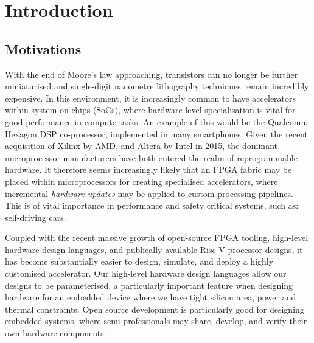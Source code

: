 \documentclass[a4paper,8pt]{report}
\begin{document}
\pagestyle{empty}
\singlespacing

\onehalfspacing

\singlespacing


\setcounter{page}{0}
\pagestyle{plain}
\tableofcontents
\listoffigures
\listoftables

\onehalfspacing

\chapter{Introduction}
\setcounter{page}{1} 
\section{Motivations}

With the end of Moore's law\cite{moore} approaching, transistors can no longer be further
miniaturised and single-digit nanometre lithography techniques remain incredibly
expensive. In this environment, it is increasingly common to have accelerators
within system-on-chips (SoCs), where hardware-level specialisation is vital for
good performance in compute tasks. An example of this would be the Qualcomm
Hexagon DSP co-processor\cite{QC-Hexagon}, implemented in many smartphones. Given the recent
acquisition of Xilinx by AMD, and Altera by Intel in 2015\cite{aa-intel-acq}, the dominant
microprocessor manufacturers have both entered the realm of reprogrammable
hardware. It therefore seems increasingly likely that an FPGA fabric may be
placed within microprocessors for creating specialised accelerators, where
incremental \textit{hardware updates} may be applied to custom processing
pipelines. This is of vital importance in performance and safety critical
systems, such as: self-driving cars.

Coupled with the recent massive growth of open-source FPGA tooling, high-level
hardware design languages, and publically available Risc-V processor designs, it
has become substantially easier to design, simulate, and deploy a highly
customised accelerator. Our high-level hardware design languages allow our
designs to be parameterised, a particularly important feature when designing
hardware for an embedded device where we have tight silicon area, power and
thermal constraints. Open source development is particularly good for designing
embedded systems, where semi-professionals may share, develop, and verify their
own hardware components.
\end{document}
